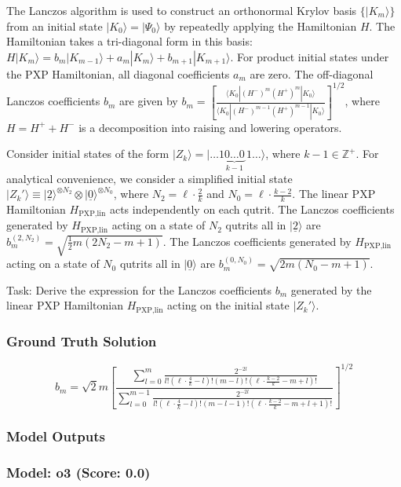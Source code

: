 \documentclass[10pt]{article}
\begin{document}
The Lanczos algorithm is used to construct an orthonormal Krylov basis $\{|K_m\rangle\}$ from an initial state $|K_0\rangle = |\Psi_0\rangle$ by repeatedly applying the Hamiltonian $H$. The Hamiltonian takes a tri-diagonal form in this basis: $H|K_m\rangle = b_m|K_{m-1}\rangle + a_m|K_m\rangle + b_{m+1}|K_{m+1}\rangle$. For product initial states under the PXP Hamiltonian, all diagonal coefficients $a_m$ are zero. The off-diagonal Lanczos coefficients $b_m$ are given by $b_m = \left[ \frac{ \langle K_0 | (H^-)^m (H^+)^m | K_0 \rangle }{ \langle K_0 | (H^-)^{m-1} (H^+)^{m-1} | K_0 \rangle } \right]^{1/2}$, where $H=H^++H^-$ is a decomposition into raising and lowering operators.

Consider initial states of the form $|Z_k\rangle = |\dots {1}\underbrace{{0}\dots {0}}_{k-1}\,{1}\dots\rangle$, where $k-1 \in \mathbb{Z}^+$. For analytical convenience, we consider a simplified initial state $|Z_k' \rangle \equiv |\underline{2} \rangle^{\otimes N_2} \otimes |\underline{0} \rangle^{\otimes N_0}$, where $N_2 = \ell \cdot \tfrac{2}{k}$ and $N_0 = \ell \cdot \tfrac{k-2}{k}$. The linear PXP Hamiltonian $H_{\text{PXP,lin}}$ acts independently on each qutrit.
The Lanczos coefficients generated by $H_{\text{PXP,lin}}$ acting on a state of $N_2$ qutrits all in $|\underline{2}\rangle$ are $b_m^{(2,N_2)} = \sqrt{\frac{1}{2} m (2N_2-m+1)}$.
The Lanczos coefficients generated by $H_{\text{PXP,lin}}$ acting on a state of $N_0$ qutrits all in $|\underline{0}\rangle$ are $b_m^{(0,N_0)} = \sqrt{2 m (N_0-m+1)}$.

Task: Derive the expression for the Lanczos coefficients $b_m$ generated by the linear PXP Hamiltonian $H_{\text{PXP,lin}}$ acting on the initial state $|Z_k'\rangle$.

\subsubsection*{Ground Truth Solution}
\[ \boxed{b_m = \sqrt{2} m \left[ \frac{\sum_{l=0}^m   \tfrac{2^{-2l}}{l! \left( \ell \cdot \frac{4}{k} -l \right)!(m-l)!\left( \ell \cdot \frac{k-2}{k} -m +l \right)!}}{\sum_{l=0}^{m-1}  \tfrac{2^{-2l}}{l! \left( \ell \cdot \frac{4}{k} -l \right)!(m-l-1)!\left( \ell \cdot \frac{k-2}{k} -m +l +1\right)!}} \right]^{1/2}} \]

\subsubsection*{Model Outputs}
\subsubsection*{Model: o3 (Score: 0.0)}
\end{document}
